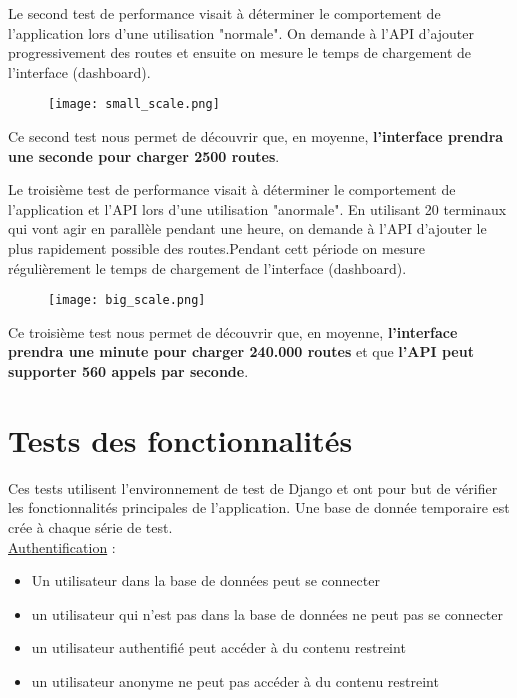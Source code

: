 \newpage
Le second test de performance visait à déterminer le comportement de l'application lors d'une utilisation "normale". \newline
On demande à l'API d'ajouter progressivement des routes et ensuite on mesure le temps de chargement de l'interface (dashboard).\newline

\begin{figure}[H]
    
    \texttt{[image: small\_scale.png]}
    
\end{figure}

Ce second test nous permet de découvrir que, en moyenne, \textbf{l'interface prendra une seconde pour charger 2500 routes}.

\newpage %
Le troisième test de performance visait à déterminer le comportement de l'application et l'API lors d'une utilisation "anormale".\newline
En utilisant 20 terminaux qui vont agir en parallèle pendant une heure, on demande à l'API d'ajouter le plus rapidement possible des routes.Pendant cett période on mesure régulièrement le temps de chargement de l'interface (dashboard).\newline



\begin{figure}[H]
    \texttt{[image: big\_scale.png]}
\end{figure}

Ce troisième test nous permet de découvrir que, en moyenne, \textbf{l'interface prendra une minute pour charger 240.000 routes} et que \textbf{l'API peut supporter 560 appels par seconde}. 

\newpage




\section{Tests des fonctionnalités}

Ces tests utilisent l'environnement de test de Django et ont pour but de vérifier les fonctionnalités principales de l'application.
Une base de donnée temporaire est crée à chaque série de test.\\

\underline{Authentification} :
\begin{itemize}
\item Un utilisateur dans la base de données peut se connecter
\item un utilisateur qui n'est pas dans la base de données ne peut pas se connecter
\item un utilisateur authentifié peut accéder à du contenu restreint
\item un utilisateur anonyme ne peut pas accéder à du contenu restreint\newline
\end{itemize}


